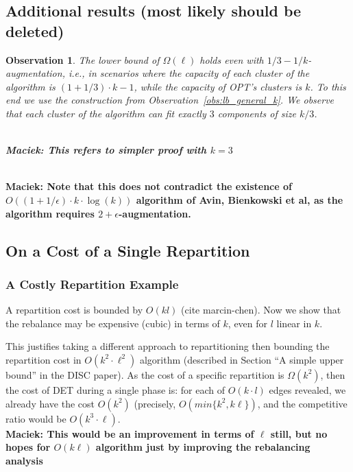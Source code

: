 \documentclass[manuscript,screen=true]{acmart}
\newtheorem{observation}{Observation}
\newcommand\maciek[1]{\color{brown}\textbf{\\ Maciek: #1}\color{black}}
\begin{document}
\begin{appendix}
    
\section{Additional results (most likely should be deleted)}

\begin{observation}
    The lower bound of $\Omega(\ell)$ holds even with $1/3-1/k$-augmentation, i.e., in scenarios where the capacity of each cluster of the algorithm is $(1+1/3)\cdot k - 1$, while the capacity of OPT's clusters is $k$.
    To this end we use the construction from Observation~\ref{obs:lb_general_k}.
    We observe that each cluster of the algorithm can fit exactly $3$ components of size $k/3$.

    \maciek{This refers to simpler proof with $k=3$}
  \end{observation}
  
  
    \maciek{Note that this does not contradict the existence of $O((1+1/\epsilon)\cdot k \cdot \log(k))$ algorithm of Avin, Bienkowski et al, as the algorithm requires $2+\epsilon$-augmentation.}



    \subsection{On a Cost of a Single Repartition}
    
    
    \subsubsection{A Costly Repartition Example}
    
    A repartition cost is bounded by $O(kl)$ (cite marcin-chen).
    Now we show that the rebalance may be expensive (cubic) in terms of $k$, even for $l$ linear in $k$.
    
    This justifies taking a different approach to repartitioning then bounding the repartition cost in $O(k^2\cdot \ell^2)$ algorithm (described in Section ``A simple upper bound'' in the DISC paper).
    As the cost of a specific repartition is $\Omega(k^2)$, then the cost of DET during a single phase is: for each of $O(k \cdot l)$ edges revealed, we already have the cost $O(k^2)$ (precisely, $O(min\{k^2, k\ell\})$, and the competitive ratio would be $O(k^3\cdot \ell)$. \maciek{This would be an improvement in terms of $\ell$ still, but no hopes for $O(k\ell)$ algorithm just by improving the rebalancing analysis}
    

\end{appendix}
\end{document}
